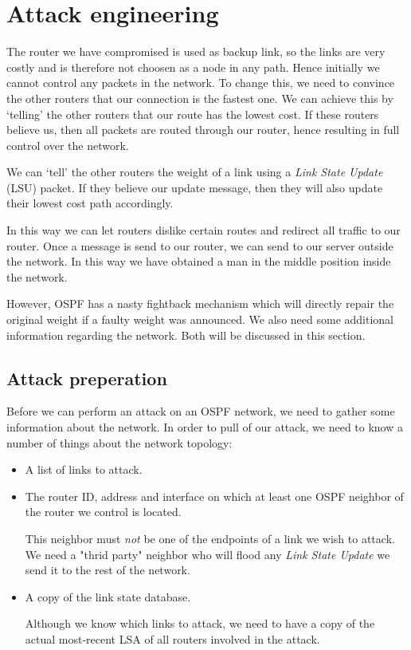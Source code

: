 \documentclass[11pt,a4paper,oneside]{article}
\newcommand{\lsection}[2]{\section{#1}\label{sec:#2}}
\newcommand{\lsubsection}[2]{\subsection{#1}\label{sec:#2}}
\begin{document}
    \lsection{Attack engineering}{attack}
    The router we have compromised is used as backup link, so the links are very costly and is therefore not choosen as a node in any path. Hence initially we cannot control any packets in the network. To change this, we need to convince the other routers that our connection is the fastest one. We can achieve this by `telling' the other routers that our route has the lowest cost. If these routers believe us, then all packets are routed through our router, hence resulting in full control over the network.

    We can `tell' the other routers the weight of a link using a \textit{Link State Update} (LSU) packet. If they believe our update message, then they will also update their lowest cost path accordingly.
    
    In this way we can let routers dislike certain routes and redirect all traffic to our router. Once a message is send to our router, we can send to our server outside the network. In this way we have obtained a man in the middle position inside the network.
    
    However, OSPF has a nasty fightback mechanism which will directly repair the original weight if a faulty weight was announced. We also need some additional information regarding the network. Both will be discussed in this section.

    \lsubsection{Attack preperation}{attack_prep}
    Before we can perform an attack on an OSPF network, we need to gather some information about the network.
    In order to pull of our attack, we need to know a number of things about the network topology:
    \begin{itemize}
        \item A list of links to attack.
        \item The router ID, address and interface on which at least one OSPF neighbor of the router we control is located.

        This neighbor must \textit{not} be one of the endpoints of a link we wish to attack.
        We need a "thrid party" neighbor who will flood any \textit{Link State Update} we send it to the rest of the network.
        \item A copy of the link state database.

        Although we know which links to attack, we need to have a copy of the actual most-recent LSA of all routers involved in the attack.
    \end{itemize}
\end{document}
